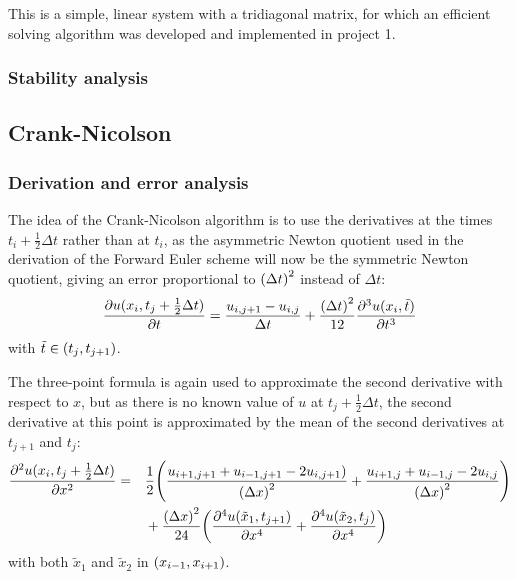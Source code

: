 \documentclass[12pt,english,a4paper]{article}
\begin{document}
This is a simple, linear system with a tridiagonal matrix, for which an efficient solving algorithm was developed and implemented in project 1\cite{oblig1}.


\subsubsection{Stability analysis}



%
\subsection{Crank-Nicolson} \label{sec:crankNicolson}

\subsubsection{Derivation and error analysis}
The idea of the Crank-Nicolson algorithm is to use the derivatives at the times \(t_i+\tfrac{1}{2}\Delta t\) rather than at \(t_i\), as the asymmetric Newton quotient used in the derivation of the Forward Euler scheme will now be the symmetric Newton quotient, giving an error proportional to \(\qty(\Delta t)^2\) instead of \(\Delta t\):
\[
    \pdv{u(x_i,t_j+\tfrac{1}{2}\Delta t)}{t} = \frac{u_{i,j+1} - u_{i,j}}{\Delta t} + \frac{\qty(\Delta t)^2}{12}\pdv[3]{u(x_i,\tilde{t})}{t}
\]
with \(\tilde{t}\in\qty(t_j,t_{j+1})\).

The three-point formula is again used to approximate the second derivative with respect to \(x\), but as there is no known value of \(u\) at \(t_j+\tfrac{1}{2}\Delta t\), the second derivative at this point is approximated by the mean of the second derivatives at \(t_{j+1}\) and \(t_j\):
\begin{alignat*}{2}
    \pdv[2]{u(x_i,t_j+\tfrac{1}{2}\Delta t)}{x} &=&& \frac{1}{2}\qty(\frac{u_{i+1,j+1} + u_{i-1,j+1} - 2u_{i,j+1})}{\qty(\Delta x)^2} + \frac{u_{i+1,j} + u_{i-1,j} - 2u_{i,j}}{\qty(\Delta x)^2})\\
    &&&+ \frac{\qty(\Delta x)^2}{24}\qty(\pdv[4]{u(\tilde{x}_1,t_{j+1})}{x} + \pdv[4]{u(\tilde{x}_2,t_j)}{x})
\end{alignat*}
with both \(\tilde{x}_1\) and \(\tilde{x}_2\) in \(\qty(x_{i-1},x_{i+1})\).
\end{document}
